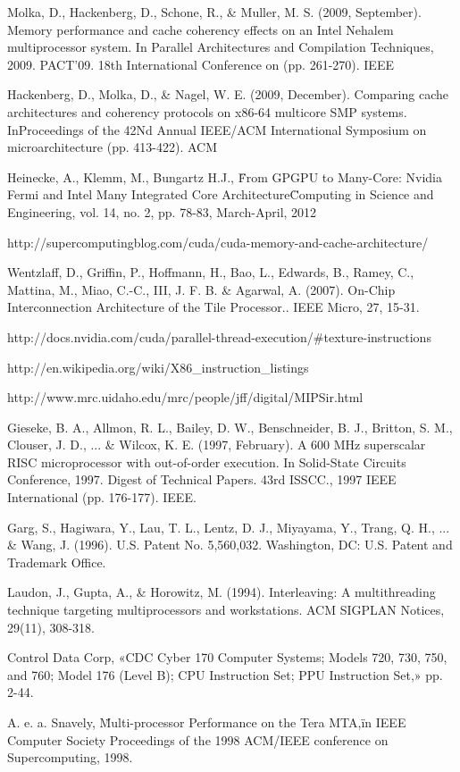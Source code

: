 \begin{thebibliography}{99}
 Molka, D., Hackenberg, D., Schone, R., \& Muller, M. S. (2009, September). Memory performance and cache coherency effects on an Intel Nehalem multiprocessor system. In Parallel Architectures and Compilation Techniques, 2009. PACT'09. 18th International Conference on (pp. 261-270). IEEE

 Hackenberg, D., Molka, D., \& Nagel, W. E. (2009, December). Comparing cache architectures and coherency protocols on x86-64 multicore SMP systems. InProceedings of the 42Nd Annual IEEE/ACM International Symposium on microarchitecture (pp. 413-422). ACM

 Heinecke, A., Klemm, M., Bungartz H.J., \"From GPGPU to Many-Core: Nvidia Fermi and Intel Many Integrated Core Architecture\" Computing in Science and Engineering, vol. 14, no. 2, pp. 78-83, March-April, 2012 

 http://supercomputingblog.com/cuda/cuda-memory-and-cache-architecture/

 Wentzlaff, D., Griffin, P., Hoffmann, H., Bao, L., Edwards, B., Ramey, C., Mattina, M., Miao, C.-C., III, J. F. B. \& Agarwal, A. (2007). On-Chip Interconnection Architecture of the Tile Processor.. IEEE Micro, 27, 15-31. 

 http://docs.nvidia.com/cuda/parallel-thread-execution/\#texture-instructions

 http://en.wikipedia.org/wiki/X86\_instruction\_listings

 http://www.mrc.uidaho.edu/mrc/people/jff/digital/MIPSir.html

 Gieseke, B. A., Allmon, R. L., Bailey, D. W., Benschneider, B. J., Britton, S. M., Clouser, J. D., ... \& Wilcox, K. E. (1997, February). A 600 MHz superscalar RISC microprocessor with out-of-order execution. In Solid-State Circuits Conference, 1997. Digest of Technical Papers. 43rd ISSCC., 1997 IEEE International (pp. 176-177). IEEE.

Garg, S., Hagiwara, Y., Lau, T. L., Lentz, D. J., Miyayama, Y., Trang, Q. H., ... \& Wang, J. (1996). U.S. Patent No. 5,560,032. Washington, DC: U.S. Patent and Trademark Office.

 Laudon, J., Gupta, A., \& Horowitz, M. (1994). Interleaving: A multithreading technique targeting multiprocessors and workstations. ACM SIGPLAN Notices, 29(11), 308-318.

Control Data Corp, «CDC Cyber 170 Computer Systems; Models 720, 730, 750, and 760; Model 176 (Level B); CPU Instruction Set; PPU Instruction Set,» pp. 2-44.

A. e. a. Snavely, \"Multi-processor Performance on the Tera MTA,\" in IEEE Computer Society Proceedings of the 1998 ACM/IEEE conference on Supercomputing, 1998. 


\end{thebibliography}